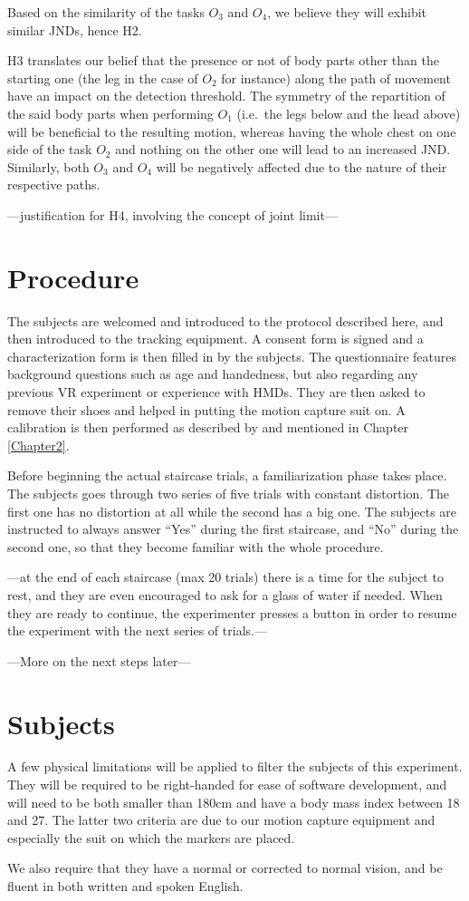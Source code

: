 Based on the similarity of the tasks $O_3$ and $O_4$, we believe they will exhibit similar JNDs, hence H2.

H3 translates our belief that the presence or not of body parts other than the starting one (the leg in the case of $O_2$ for instance) along the path of movement have an impact on the detection threshold. The symmetry of the repartition of the said body parts when performing $O_1$ (i.e.\ the legs below and the head above) will be beneficial to the resulting motion, whereas having the whole chest on one side of the task $O_2$ and nothing on the other one will lead to an increased JND. Similarly, both $O_3$ and $O_4$ will be negatively affected due to the nature of their respective paths. \cite{burns2007macbeth}

---justification for H4, involving the concept of joint limit---

\section{Procedure}

The subjects are welcomed and introduced to the protocol described here, and then introduced to the tracking equipment. A consent form is signed and a characterization form is then filled in by the subjects. The questionnaire features background questions such as age and handedness, but also regarding any previous VR experiment or experience with HMDs. They are then asked to remove their shoes and helped in putting the motion capture suit on. A calibration is then performed as described by \cite{molla2017egocentric} and mentioned in Chapter \ref{Chapter2}.

Before beginning the actual staircase trials, a familiarization phase takes place. The subjects goes through two series of five trials with constant distortion. The first one has no distortion at all while the second has a big one. The subjects are instructed to always answer ``Yes'' during the first staircase, and ``No'' during the second one, so that they become familiar with the whole procedure.

---at the end of each staircase (max 20 trials) there is a time for the subject to rest, and they are even encouraged to ask for a glass of water if needed. When they are ready to continue, the experimenter presses a button in order to resume the experiment with the next series of trials.---

---More on the next steps later---

\section{Subjects}

A few physical limitations will be applied to filter the subjects of this experiment. They will be required to be right-handed for ease of software development, and will need to be both smaller than 180cm and have a body mass index between 18 and 27. The latter two criteria are due to our motion capture equipment and especially the suit on which the markers are placed.

We also require that they have a normal or corrected to normal vision, and be fluent in both written and spoken English.
